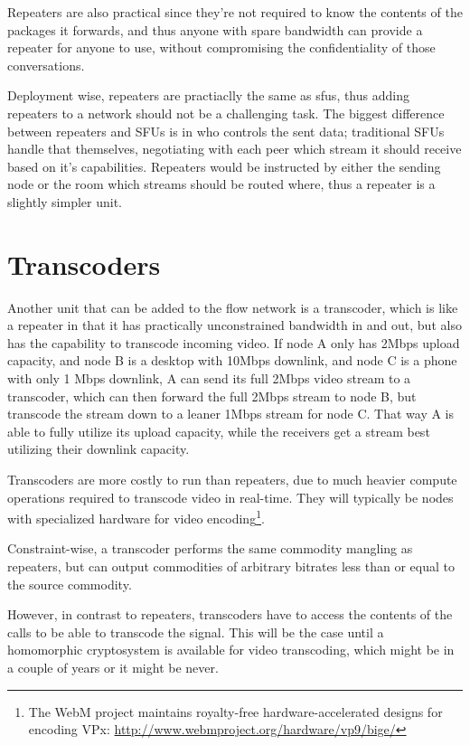 Repeaters are also practical since they're not required to know the contents of the packages it forwards, and thus anyone with spare bandwidth can provide a repeater for anyone to use, without compromising the confidentiality of those conversations.

Deployment wise, repeaters are practiaclly the same as \glspl{sfu}, thus adding repeaters to a network should not be a challenging task. The biggest difference between repeaters and SFUs is in who controls the sent data; traditional SFUs handle that themselves, negotiating with each peer which stream it should receive based on it's capabilities. Repeaters would be instructed by either the sending node or the room which streams should be routed where, thus a repeater is a slightly simpler unit.


\section{Transcoders}

Another unit that can be added to the flow network is a transcoder, which is like a repeater in that it has practically unconstrained bandwidth in and out, but also has the capability to transcode incoming video. If node A only has 2Mbps upload capacity, and node B is a desktop with 10Mbps downlink, and node C is a phone with only 1 Mbps downlink, A can send its full 2Mbps video stream to a transcoder, which can then forward the full 2Mbps stream to node B, but transcode the stream down to a leaner 1Mbps stream for node C. That way A is able to fully utilize its upload capacity, while the receivers get a stream best utilizing their downlink capacity.

Transcoders are more costly to run than repeaters, due to much heavier compute operations required to transcode video in real-time. They will typically be nodes with specialized hardware for video encoding\footnote{The WebM project maintains royalty-free hardware-accelerated designs for encoding VPx: \url{http://www.webmproject.org/hardware/vp9/bige/}}.

Constraint-wise, a transcoder performs the same commodity mangling as repeaters, but can output commodities of arbitrary bitrates less than or equal to the source commodity.

However, in contrast to repeaters, transcoders have to access the contents of the calls to be able to transcode the signal. This will be the case until a homomorphic cryptosystem is available for video transcoding, which might be in a couple of years or it might be never.


